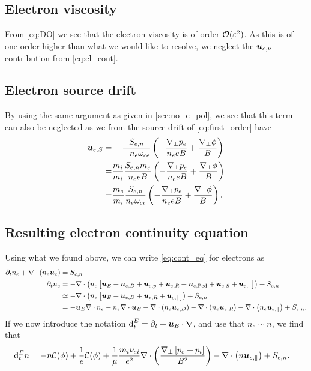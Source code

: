 \subsection{Electron viscosity}
%
From \cref{eq:DO} we see that the electron viscosity is of order $\mathcal{O}(\varepsilon^2)$.
As this is of one order higher than what we would like to resolve, we neglect the $\boldsymbol{u}_{e,\nu}$ contribution from \cref{eq:el_cont}.

\subsection{Electron source drift}
\label{sec:no_e_source}
%
By using the same argument as given in \cref{sec:no_e_pol}, we see that this term can also be neglected as we from the source drift of \cref{eq:first_order} have
%
\begin{align*}
    \ve{u}_{e,S}
    =&
    - \frac{ S_{e,n}}{-n_e \om_{ce}}
    \L(- \frac{\grad_\perp p_e}{n_e e B}
  + \frac{\grad_\perp \phi}{B} \R)
  \\
%
  =&
  \frac{m_i}{m_i}
  \frac{ S_{e,n} m_e}{n_e e B} \L(
  - \frac{\grad_\perp p_e}{n_e e B}
  + \frac{\grad_\perp \phi}{B} \R)
  \\
%
  =&
   \frac{m_e}{m_i} \frac{ S_{e,n}}{n_e \om_{ci}} \L(
   -
  \frac{\grad_\perp p_e}{n_e e B}
  + \frac{\grad_\perp \phi}{B}
  \R).
\end{align*}

\subsection{Resulting electron continuity equation}
%
Using what we found above, we can write \cref{eq:cont_eq} for electrons as
%
\begin{align*}
    \partial_t n_e + \div\L(n_e\ve{u}_e\R)
    &= S_{e,n}
    \\
%
    \partial_t n_e
    &=
    - \div\L(n_e\L[ \ve{u}_E
    + \ve{u}_{e,D}
    + \ve{u}_{e,p}
    + \ve{u}_{e,R}
    + \ve{u}_{e,\text{Ped}}
    + \ve{u}_{e,S}
    + \ve{u}_{e,\|} \R]\R)
    + S_{e,n}
    \\
%
    &\simeq
    - \div\L(n_e\L[\ve{u}_E + \ve{u}_{e,D} + \ve{u}_{e,R} + \ve{u}_{e,\|}\R]\R)
    + S_{e,n}
    \\
%
    &=
    - \ve{u}_E\nabla\cdot n_e
    - n_e\div\ve{u}_E
    - \div\L(n_e \ve{u}_{e,D}\R)
    - \div\L(n_e \ve{u}_{e,R}\R)
    - \div\L(n_e \ve{u}_{e,\|}\R)
    + S_{e,n}.
\end{align*}
%
If we now introduce the notation $\text{d}_t^E = \partial_t + \boldsymbol{u}_E\cdot\nabla$, and use that $n_e\sim n$, we find that
%
\begin{align}
    \text{d}_t^E n
    &=
    - n\mathcal{C}(\phi)
    + \frac{1}{e}\mathcal{C}(\phi)
    +\frac{1}{\mu}\frac{m_i\nu_{ei}}{e^2}
    \nabla\cdot\left( \frac{\nabla_\perp \left[p_e + p_i\right]}{B^2} \right)
    - \nabla\cdot\left(n \boldsymbol{u}_{e,\|}\right)
    + S_{e,n}.
    \label{eq:dens_evol_gen}
\end{align}

